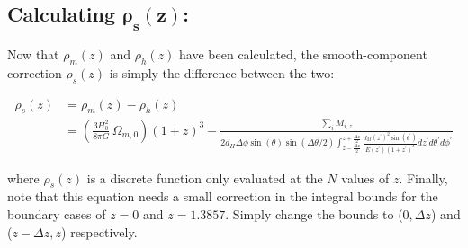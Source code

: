 \documentclass[12pt]{article}
\begin{document}
\subsection*{Calculating $\bm{\rho_s(z)}$:}

Now that $\rho_m(z)$ and $\rho_h(z)$ have been calculated, the smooth-component correction $\rho_s(z)$ is simply the difference between the two:

\begin{align}\label{smooth_component} 
\rho_s(z)&=\rho_m(z)-\rho_h(z)\nonumber\\
&=\left(\frac{3H_0^2}{8\pi G}\,\Omega_{m,0}\right)(1+z)^3 - \frac{\sum_i M_{i,z}}{2d_H\Delta\phi\sin(\theta)\sin(\Delta\theta/2)\int_{z-\frac{\Delta z}{2}}^{z+\frac{\Delta z}{2}} \frac{d_M(z^\prime)^2\sin(\theta^\prime)}{E(z^\prime)(1+z^\prime)^3}dz^\prime d\theta^\prime d\phi^\prime}
\end{align}

where $\rho_s(z)$ is a discrete function only evaluated at the $N$ values of $z$. Finally, note that this equation needs a small correction in the integral bounds for the boundary cases of $z=0$ and $z=1.3857$. Simply change the bounds to ($0,\Delta z$) and ($z-\Delta z,z$) respectively.
\end{document}
